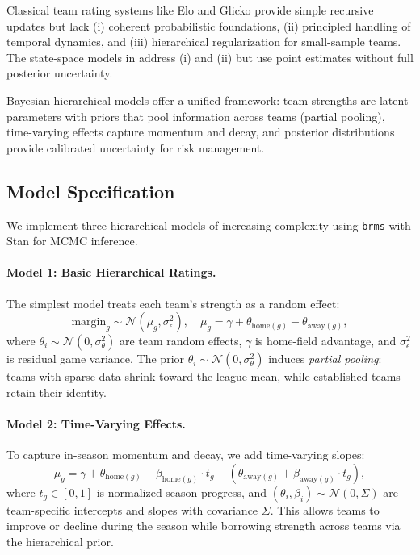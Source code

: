 Classical team rating systems like Elo \citep{elo1978} and Glicko \citep{glickman1999} provide simple recursive updates but lack (i) coherent probabilistic foundations, (ii) principled handling of temporal dynamics, and (iii) hierarchical regularization for small-sample teams. The state-space models in  address (i) and (ii) but use point estimates without full posterior uncertainty.

Bayesian hierarchical models \citep{gelman2013} offer a unified framework: team strengths are latent parameters with priors that pool information across teams (partial pooling), time-varying effects capture momentum and decay, and posterior distributions provide calibrated uncertainty for risk management.

\subsection{Model Specification}

We implement three hierarchical models of increasing complexity using \texttt{brms} \citep{burkner2017} with Stan \citep{carpenter2017} for MCMC inference.

\paragraph{Model 1: Basic Hierarchical Ratings.}
The simplest model treats each team's strength as a random effect:
\begin{equation}\label{eq:bayes-m1}
\text{margin}_{g} \sim \mathcal{N}(\mu_g, \sigma_\epsilon^2), \quad
\mu_g = \gamma + \theta_{\text{home}(g)} - \theta_{\text{away}(g)},
\end{equation}
where $\theta_i \sim \mathcal{N}(0, \sigma_\theta^2)$ are team random effects, $\gamma$ is home-field advantage, and $\sigma_\epsilon^2$ is residual game variance. The prior $\theta_i \sim \mathcal{N}(0, \sigma_\theta^2)$ induces \emph{partial pooling}: teams with sparse data shrink toward the league mean, while established teams retain their identity.

\paragraph{Model 2: Time-Varying Effects.}
To capture in-season momentum and decay, we add time-varying slopes:
\begin{equation}\label{eq:bayes-m2}
\mu_g = \gamma + \theta_{\text{home}(g)} + \beta_{\text{home}(g)} \cdot t_g - (\theta_{\text{away}(g)} + \beta_{\text{away}(g)} \cdot t_g),
\end{equation}
where $t_g \in [0,1]$ is normalized season progress, and $(\theta_i, \beta_i) \sim \mathcal{N}(0, \Sigma)$ are team-specific intercepts and slopes with covariance $\Sigma$. This allows teams to improve or decline during the season while borrowing strength across teams via the hierarchical prior.

